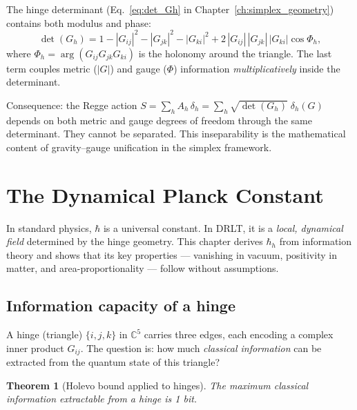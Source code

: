 \documentclass[12pt]{article}
\newtheorem{theorem}{Theorem}[section]
\theoremstyle{remark}
\theoremstyle{definition}
\begin{document}
The hinge determinant (Eq.~\ref{eq:det_Gh} in Chapter~\ref{ch:simplex_geometry}) contains both modulus and phase:
\begin{equation}
\det(G_h) = 1 - |G_{ij}|^2 - |G_{jk}|^2 - |G_{ki}|^2 + 2\,|G_{ij}|\,|G_{jk}|\,|G_{ki}|\cos\Phi_h,
\end{equation}
where $\Phi_h = \arg(G_{ij} G_{jk} G_{ki})$ is the holonomy around the triangle.  The last term couples metric ($|G|$) and gauge ($\Phi$) information \emph{multiplicatively} inside the determinant.

Consequence: the Regge action $S = \sum_h A_h\,\delta_h = \sum_h \sqrt{\det(G_h)}\;\delta_h(G)$ depends on both metric and gauge degrees of freedom through the same determinant.  They cannot be separated.  This inseparability is the mathematical content of gravity--gauge unification in the simplex framework.



\section{The Dynamical Planck Constant}
\label{ch:hbar}

In standard physics, $\hbar$ is a universal constant. In DRLT, it is a \emph{local, dynamical field} determined by the hinge geometry. This chapter derives $\hbar_h$ from information theory and shows that its key properties --- vanishing in vacuum, positivity in matter, and area-proportionality --- follow without assumptions.

\subsection{Information capacity of a hinge}

A hinge (triangle) $\{i, j, k\}$ in $\mathbb{C}^5$ carries three edges, each encoding a complex inner product $G_{ij}$. The question is: how much \emph{classical information} can be extracted from the quantum state of this triangle?

\begin{theorem}[Holevo bound applied to hinges]
\label{thm:holevo}
The maximum classical information extractable from a hinge is 1 bit.
\end{theorem}
\end{document}
